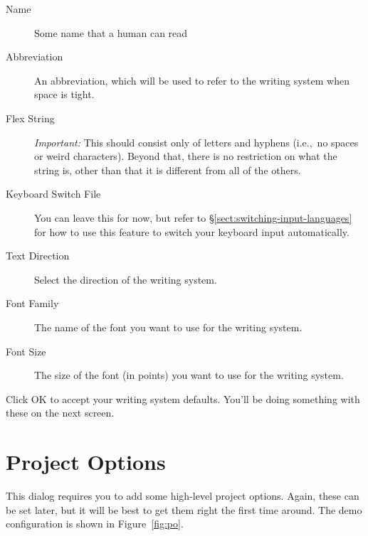 \documentclass[oneside]{book}
\def\ie{i.e.,~}
\def\sect#1{§\ref{#1}}
\def\fig#1{Figure~\ref{#1}}
\begin{document}
\begin{description}
\item[Name] Some name that a human can read
\item[Abbreviation] An abbreviation, which will be used to refer to the writing system when space is tight.
\item[Flex String] \emph{Important:} This should consist only of letters and hyphens (\ie no spaces or weird characters). Beyond that, there is no restriction on what the string is, other than that it is different from all of the others.
\item[Keyboard Switch File] You can leave this for now, but refer to  \sect{sect:switching-input-languages} for how to use this feature to switch your keyboard input automatically.
\item[Text Direction] Select the direction of the writing system.
\item[Font Family] The name of the font you want to use for the writing system.
\item[Font Size] The size of the font (in points) you want to use for the writing system.
\end{description}
Click OK to accept your writing system defaults. You'll be doing something with these on the next screen.

\section{Project Options}
This dialog requires you to add some high-level project options. Again, these can be set later, but it will be best to get them right the first time around. The demo configuration is shown in \fig{fig:po}.
\end{document}
